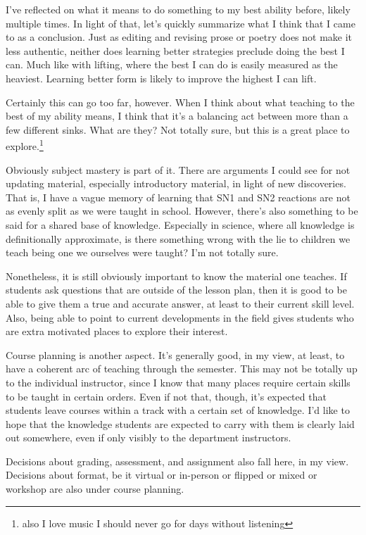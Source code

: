 \documentclass[12pt]{article}
\renewcommand{\,}{\textsuperscript{,}}
\begin{document}
I've reflected on what it means to do something to my best ability before, likely multiple times.
In light of that, let's quickly summarize what I think that I came to as a conclusion.
Just as editing and revising prose or poetry does not make it less authentic, neither does learning better strategies preclude doing the best I can.
Much like with lifting, where the best I can do is easily measured as the heaviest.
Learning better form is likely to improve the highest I can lift.

Certainly this can go too far, however.
When I think about what teaching to the best of my ability means, I think that it's a balancing act between more than a few different sinks.
What are they? Not totally sure, but this is a great place to explore.\footnote{also I love music I should never go for days without listening}

Obviously subject mastery is part of it.
There are arguments I could see for not updating material, especially introductory material, in light of new discoveries.
That is, I have a vague memory of learning that SN1 and SN2 reactions are not as evenly split as we were taught in school.
However, there's also something to be said for a shared base of knowledge.
Especially in science, where all knowledge is definitionally approximate, is there something wrong with the lie to children we teach being one we ourselves were taught?
I'm not totally sure.

Nonetheless, it is still obviously important to know the material one teaches.
If students ask questions that are outside of the lesson plan, then it is good to be able to give them a true and accurate answer, at least to their current skill level.
Also, being able to point to current developments in the field gives students who are extra motivated places to explore their interest.

Course planning is another aspect.
It's generally good, in my view, at least, to have a coherent arc of teaching through the semester.
This may not be totally up to the individual instructor, since I know that many places require certain skills to be taught in certain orders.
Even if not that, though, it's expected that students leave courses within a track with a certain set of knowledge.
I'd like to hope that the knowledge students are expected to carry with them is clearly laid out somewhere, even if only visibly to the department instructors.

Decisions about grading, assessment, and assignment also fall here, in my view.
Decisions about format, be it virtual or in-person or flipped or mixed or workshop are also under course planning.
\end{document}
